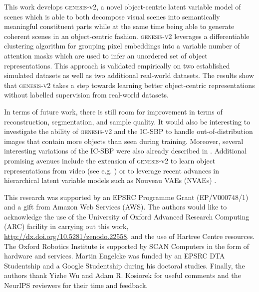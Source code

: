 \documentclass{article}
\begin{document}
This work develops \textsc{genesis-v2}, a novel object-centric latent variable model of scenes which is able to both decompose visual scenes into semantically meaningful constituent parts while at the same time being able to generate coherent scenes in an object-centric fashion.
\textsc{genesis-v2} leverages a differentiable clustering algorithm for grouping pixel embeddings into a variable number of attention masks which are used to infer an unordered set of object representations.
This approach is validated empirically on two established simulated datasets as well as two additional real-world datasets.
The results show that \textsc{genesis-v2} takes a step towards learning better object-centric representations without labelled supervision from real-world datasets.

In terms of future work, there is still room for improvement in terms of reconstruction, segmentation, and sample quality.
It would also be interesting to investigate the ability of \textsc{genesis-v2} and the IC-SBP to handle out-of-distribution images that contain more objects than seen during training.
Moreover, several interesting variations of the IC-SBP were also already described in .
Additional promising avenues include the extension of \textsc{genesis-v2} to learn object representations from video (see e.g. \cite{kosiorek2018sqair,jiang2020scalor}) or to leverage recent advances in hierarchical latent variable models such as Nouveau VAEs (NVAEs) \cite{vahdat2020nvae}.

\clearpage


\begin{ack}


This research was supported by an EPSRC Programme Grant (EP/V000748/1) and a gift from Amazon Web Services (AWS). The authors would like to acknowledge the use of the University of Oxford Advanced Research Computing (ARC) facility in carrying out this work, \url{http://dx.doi.org/10.5281/zenodo.22558}, and the use of Hartree Centre resources. The Oxford Robotics Institute is supported by SCAN Computers in the form of hardware and services. Martin Engelcke was funded by an EPSRC DTA Studentship and a Google Studentship during his doctoral studies.
Finally, the authors thank Yizhe Wu and Adam R. Kosiorek for useful comments and the NeurIPS reviewers for their time and feedback.
\end{ack}


{\small

}


\clearpage
\end{document}
